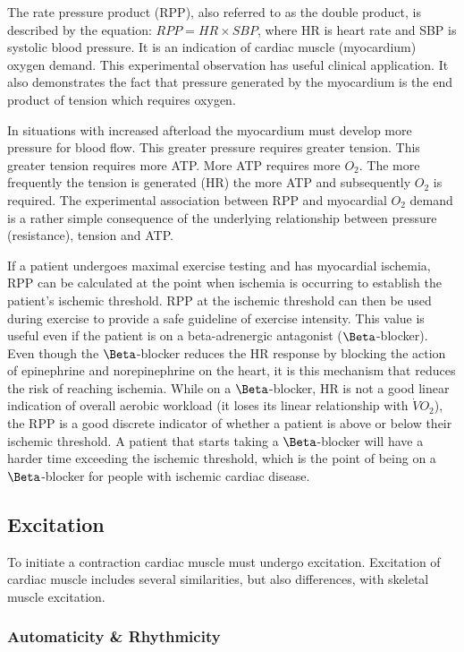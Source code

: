 The rate pressure product (RPP), also referred to as the double product, is described by the equation: $RPP = HR \times SBP$, where HR is heart rate and SBP is systolic blood pressure. It is an indication of cardiac muscle (myocardium) oxygen demand. This experimental observation has useful clinical application. It also demonstrates the fact that pressure generated by the myocardium is the end product of tension which requires oxygen.

In situations with increased afterload the myocardium must develop more pressure for blood flow. This greater pressure requires greater tension. This greater tension requires more ATP. More ATP requires more $O_2$. The more frequently the tension is generated (HR) the more ATP and subsequently $O_2$ is required. The experimental association between RPP and myocardial $O_2$ demand is a rather simple consequence of the underlying relationship between pressure (resistance), tension and ATP.

If a patient undergoes maximal exercise testing and has myocardial ischemia, RPP can be calculated at the point when ischemia is occurring to establish the patient’s ischemic threshold. RPP at the ischemic threshold can then be used during exercise to provide a safe guideline of exercise intensity. This value is useful even if the patient is on a beta-adrenergic antagonist ($\Beta$-blocker). Even though the $\Beta$-blocker reduces the HR response by blocking the action of epinephrine and norepinephrine on the heart, it is this mechanism that reduces the risk of reaching ischemia. While on a $\Beta$-blocker, HR is not a good linear indication of overall aerobic workload (it loses its linear relationship with $\dot{V}O_2$), the RPP is a good discrete indicator of whether a patient is above or below their ischemic threshold. A patient that starts taking a $\Beta$-blocker will have a harder time exceeding the ischemic threshold, which is the point of being on a $\Beta$-blocker for people with ischemic cardiac disease. 


\subsection{Excitation}

To initiate a contraction cardiac muscle must undergo excitation. Excitation of cardiac muscle includes several similarities, but also differences, with skeletal muscle excitation. 

\subsubsection{Automaticity \& Rhythmicity}

